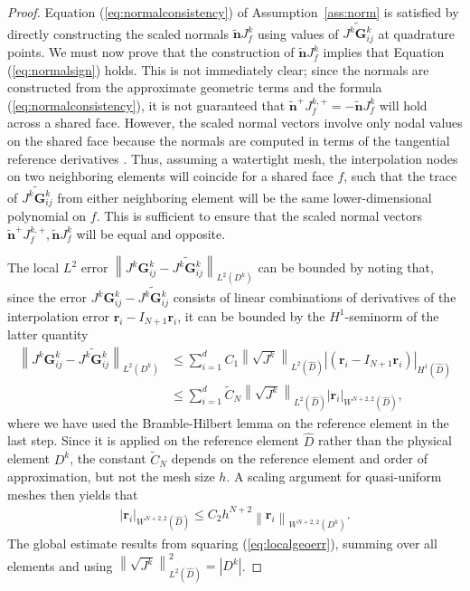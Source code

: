 \documentclass[preprint,10pt]{article}
\theoremstyle{definition}
\theoremstyle{lemma}
\theoremstyle{theorem}
\theoremstyle{assumption}
\renewcommand{\hat}{\widehat}
\renewcommand{\tilde}{\widetilde}
\newcommand{\nor}[1]{\left\| #1 \right\|}
\newcommand{\LRp}[1]{\left( #1 \right)}
\newcommand{\LRb}[1]{\left| #1 \right|}
\newcommand{\Grad} {\ensuremath{\nabla}}
\begin{document}
{\begin{proof}
Equation (\ref{eq:normalconsistency}) of Assumption~\ref{ass:norm} is satisfied by directly constructing the scaled normals $\tilde{\bm{n}}J^k_f$ using values of $\tilde{J^k\bm{G}^k_{ij}}$ at quadrature points.  We must now prove that the construction of $\tilde{\bm{n}}J^k_f$ implies that Equation (\ref{eq:normalsign}) holds. This is not immediately clear; since the normals are constructed from the approximate geometric terms and the formula (\ref{eq:normalconsistency}), it is not guaranteed that $\tilde{\bm{n}}^+J^{k,+}_f = -\tilde{\bm{n}}J^k_f$ will hold across a shared face.  However, the scaled normal vectors involve only nodal values on the shared face because the normals are computed in terms of the tangential reference derivatives \cite{kopriva2006metric}.  Thus, assuming a watertight mesh, the interpolation nodes on two neighboring elements will coincide for a shared face $f$, such that the trace of $\tilde{J^k\bm{G}^k_{ij}}$ from either neighboring element will be the same lower-dimensional polynomial on $f$.  This is sufficient to ensure that the scaled normal vectors $\tilde{\bm{n}}^+J^{k,+}_f, \tilde{\bm{n}}J^k_f$ will be equal and opposite.  

The local $L^2$ error $\nor{{J^k\bm{G}^k_{ij}}-\tilde{J^k\bm{G}^k_{ij}}}_{L^2\LRp{D^k}}$ can be bounded by noting that, since the error $J^k\bm{G}^k_{ij}-\tilde{J^k\bm{G}^k_{ij}}$ consists of linear combinations of derivatives of the interpolation error $\bm{r}_i-I_{N+1}\bm{r}_i$, it can be bounded by the $H^1$-seminorm of the latter quantity
\begin{align*}
\nor{{J^k\bm{G}^k_{ij}}-\tilde{J^k\bm{G}^k_{ij}}}_{L^2\LRp{D^k}} &\leq %
 \sum_{i=1}^d C_1 \nor{\sqrt{J^k}}_{L^2\LRp{\hat{D}}} \LRb{\LRp{\bm{r}_i-I_{N+1}\bm{r}_i}}_{H^1\LRp{\hat{D}}}\\
 &\leq  \sum_{i=1}^d \tilde{C}_N \nor{\sqrt{J^k}}_{L^2\LRp{\hat{D}}} \LRb{\bm{r}_i}_{W^{N+2,2}\LRp{\hat{D}}},
\end{align*}
where we have used the Bramble-Hilbert lemma \cite{brenner2007mathematical} on the reference element in the last step.  Since it is applied on the reference element $\hat{D}$ rather than the physical element $D^k$, the constant $\tilde{C}_N$ depends on the reference element and order of approximation, but not the mesh size $h$.  A scaling argument for quasi-uniform meshes then yields that
\begin{align}
\LRb{\bm{r}_i}_{W^{N+2,2}\LRp{\hat{D}}} \leq C_2 h^{N+2}\nor{\bm{r}_i}_{W^{N+2,2}\LRp{D^k}}.
\label{eq:localgeoerr}
\end{align}
The global estimate results from squaring (\ref{eq:localgeoerr}), summing over all elements and using $\nor{\sqrt{J^k}}^2_{L^2\LRp{\hat{D}}} = \LRb{D^k}$.
\end{proof}

}
\end{document}
